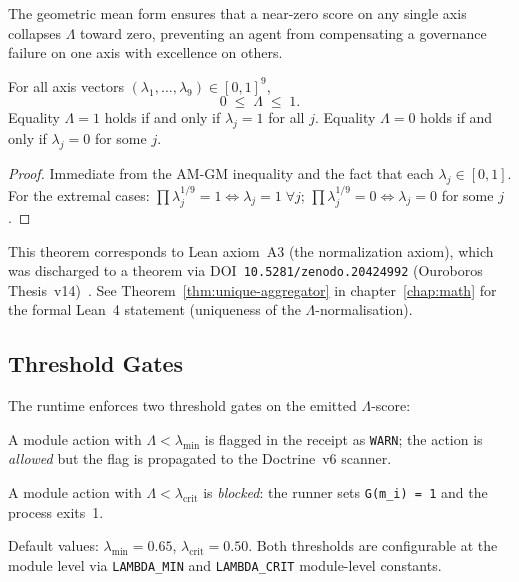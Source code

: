The geometric mean form ensures that a near-zero score on any single axis
collapses \(\Lambda\) toward zero, preventing an agent from compensating
a governance failure on one axis with excellence on others.

\begin{theorem}
  \label{thm:lambda-bounded}
  For all axis vectors \((\lambda_1, \ldots, \lambda_9) \in [0,1]^9\),
  \[
    0 \;\leq\; \Lambda \;\leq\; 1.
  \]
  Equality \(\Lambda = 1\) holds if and only if
  \(\lambda_j = 1\) for all \(j\).  Equality \(\Lambda = 0\) holds
  if and only if \(\lambda_j = 0\) for some \(j\).
\end{theorem}

\begin{proof}
  Immediate from the AM-GM inequality and the fact that each \(\lambda_j
  \in [0,1]\).  For the extremal cases: \(\prod \lambda_j^{1/9} = 1 \iff
  \lambda_j = 1\;\forall j\); \(\prod \lambda_j^{1/9} = 0 \iff \lambda_j
  = 0\) for some \(j\).
\end{proof}

This theorem corresponds to Lean axiom~A3 (the normalization axiom), which
was discharged to a theorem via DOI~\texttt{10.5281/zenodo.20424992}
(Ouroboros Thesis~v14)~\cite{lutar_v14_doi}.  See
Theorem~\ref{thm:unique-aggregator} in chapter~\ref{chap:math} for the formal Lean~4 statement (uniqueness of the $\Lambda$-normalisation).

\subsection{Threshold Gates}
\label{ssec:threshold-gates}

The runtime enforces two threshold gates on the emitted \(\Lambda\)-score:

\begin{definition}
  \label{def:soft-gate}
  A module action with \(\Lambda < \lambda_{\min}\) is flagged in the
  receipt as \texttt{WARN}; the action is \emph{allowed} but the flag is
  propagated to the Doctrine~v6 scanner.
\end{definition}

\begin{definition}
  \label{def:hard-gate}
  A module action with \(\Lambda < \lambda_{\mathrm{crit}}\) is
  \emph{blocked}: the runner sets \texttt{G(m\_i) = 1} and the process
  exits~1.
\end{definition}

Default values: \(\lambda_{\min} = 0.65\), \(\lambda_{\mathrm{crit}} = 0.50\).
Both thresholds are configurable at the module level via
\texttt{LAMBDA\_MIN} and \texttt{LAMBDA\_CRIT} module-level constants.

